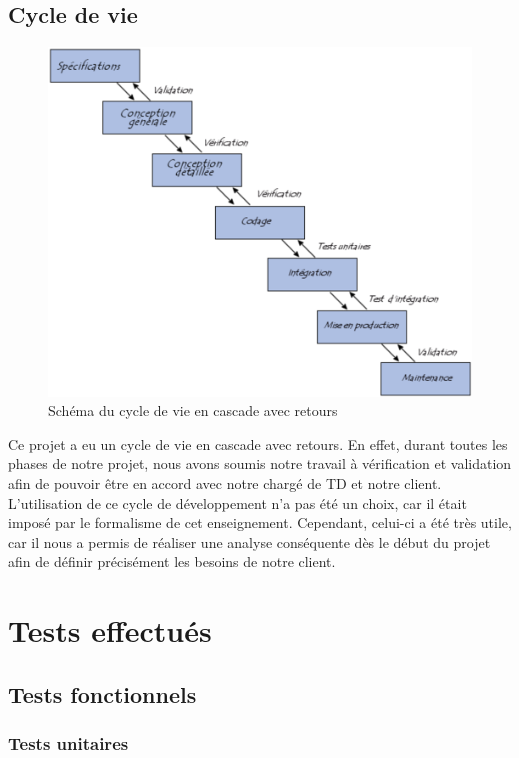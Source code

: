 \documentclass[17pts]{report}
\begin{document}
\section{Cycle de vie}
\label{sec:Cycle de vie}
\begin{figure}[H]
    \includegraphics[scale=0.7]{./illustrations/cycle_cascade.png}
    \centering
    \caption{Schéma du cycle de vie en cascade avec retours}
    \label{fig:CycleCascade}
\end{figure}

Ce projet a eu un cycle de vie en cascade avec retours. En effet, durant toutes
les phases de notre projet, nous avons soumis notre travail à vérification et
validation afin de pouvoir être en accord avec notre chargé de TD et notre
client. L'utilisation de ce cycle de développement n'a pas été un choix, car il
était imposé par le formalisme de cet enseignement. Cependant, celui-ci a été
très utile, car il nous a permis de réaliser une analyse conséquente dès le
début du projet afin de définir précisément les besoins de notre client.

\chapter{Tests effectués}\thispagestyle{IHA-fancy-style}
\label{cha:Tests}
\section{Tests fonctionnels}
\label{sec:Tests fonctionnels}
\subsection{Tests unitaires}
\label{sub:Tests unitaires}
\end{document}
